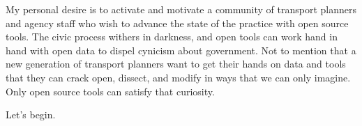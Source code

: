 My personal desire is to activate and motivate a community of transport planners and agency staff who wish to advance the state of the practice with open source tools. The civic process withers in darkness, and open tools can work hand in hand with open data to dispel cynicism about government. Not to mention that a new generation of transport planners want to get their hands on data and tools that they can crack open, dissect, and modify in ways that we can only imagine. Only open source tools can satisfy that curiosity.

Let's begin.

